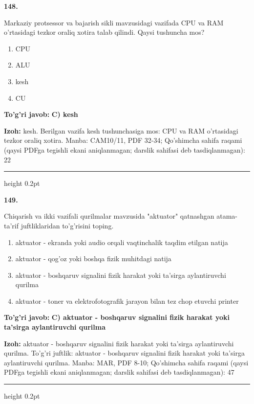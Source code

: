 \documentclass[10pt,a4paper]{article}
\begin{document}
{\bfseries\sffamily\color{ink} 148.}
\par
Markaziy protsessor va bajarish sikli mavzusidagi vazifada CPU va RAM o'rtasidagi tezkor oraliq xotira talab qilindi. Qaysi tushuncha mos?
\begin{enumerate}[label=\Alph*),leftmargin=9mm]
\item CPU
\item ALU
\item kesh
\item CU
\end{enumerate}
\begin{tcolorbox}[enhanced,breakable,colback=teal!4,colframe=teal!60!black,boxrule=0.45pt,arc=1.2mm,left=2.7mm,right=2.7mm,top=1.8mm,bottom=1.8mm,before skip=2mm,after skip=2mm]
{\bfseries\sffamily\color{teal}To'g'ri javob:} \textbf{C) kesh}
\par\smallskip
{\bfseries Izoh:} kesh. Berilgan vazifa kesh tushunchasiga mos: CPU va RAM o'rtasidagi tezkor oraliq xotira. Manba: CAM10/11, PDF 32-34; Qo'shimcha sahifa raqami (qaysi PDFga tegishli ekani aniqlanmagan; darslik sahifasi deb tasdiqlanmagan): 22
\end{tcolorbox}
\vspace{2mm}\hrule height 0.2pt\vspace{3mm}

{\bfseries\sffamily\color{ink} 149.}
\par
Chiqarish va ikki vazifali qurilmalar mavzusida "aktuator" qatnashgan atama-ta'rif juftliklaridan to'g'risini toping.
\begin{enumerate}[label=\Alph*),leftmargin=9mm]
\item aktuator - ekranda yoki audio orqali vaqtinchalik taqdim etilgan natija
\item aktuator - qog'oz yoki boshqa fizik muhitdagi natija
\item aktuator - boshqaruv signalini fizik harakat yoki ta'sirga aylantiruvchi qurilma
\item aktuator - toner va elektrofotografik jarayon bilan tez chop etuvchi printer
\end{enumerate}
\begin{tcolorbox}[enhanced,breakable,colback=teal!4,colframe=teal!60!black,boxrule=0.45pt,arc=1.2mm,left=2.7mm,right=2.7mm,top=1.8mm,bottom=1.8mm,before skip=2mm,after skip=2mm]
{\bfseries\sffamily\color{teal}To'g'ri javob:} \textbf{C) aktuator - boshqaruv signalini fizik harakat yoki ta'sirga aylantiruvchi qurilma}
\par\smallskip
{\bfseries Izoh:} aktuator - boshqaruv signalini fizik harakat yoki ta'sirga aylantiruvchi qurilma. To'g'ri juftlik: aktuator - boshqaruv signalini fizik harakat yoki ta'sirga aylantiruvchi qurilma. Manba: MAR, PDF 8-10; Qo'shimcha sahifa raqami (qaysi PDFga tegishli ekani aniqlanmagan; darslik sahifasi deb tasdiqlanmagan): 47
\end{tcolorbox}
\vspace{2mm}\hrule height 0.2pt\vspace{3mm}
\end{document}
